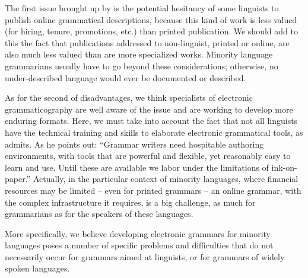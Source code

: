 The first issue brought up by  \citet{Noonan2006} is the potential hesitancy of some linguists to publish online grammatical descriptions, because this kind of work is less valued (for hiring, tenure, promotions, etc.) than printed publication. We should add to this the fact that publications addressed to non-linguist, printed or online, are also much less valued than are more specialized works. Minority language grammarians usually have to go beyond these considerations; otherwise, no under-described language would ever be documented or described. 

As for the second of  \citet{Noonan2006} disadvantages, we think specialists of electronic grammaticography are well aware of the issue and are working to develop more enduring formats. Here, we must take into account the fact that not all linguists have the technical training and skills to elaborate electronic grammatical tools, as  \citet[459]{Weber2006grow} admits. As he points out: ``Grammar writers need hospitable authoring environments, with tools that are powerful and flexible, yet reasonably easy to learn and use. Until these are available we labor under the limitations of ink-on-paper.'' Actually, in the particular context of minority languages, where financial resources may be limited -- even for printed grammars -- an online grammar, with the complex infrastructure it requires, is a big challenge, as much for grammarians as for the speakers of these languages.

More specifically, we believe developing electronic grammars for minority languages poses a number of specific problems and difficulties that do not necessarily occur for grammars aimed at linguists, or for grammars of widely spoken languages. 

